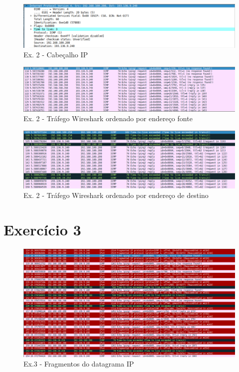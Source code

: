 \documentclass[a4paper]{report}
\begin{document}
\begin{figure}[H]
    \centering 
    \includegraphics[width=\textwidth]{images/ipEx2.png}
    \caption{Ex. 2 - Cabeçalho IP}
    \label{fig:ipEx2}
\end{figure}

\begin{figure}[H]
    \centering 
    \includegraphics[width=\textwidth]{images/wiresharkSourceEx2.png}
    \caption{Ex. 2 - Tráfego Wireshark ordenado por endereço fonte}
    \label{fig:wiresharkSourceEx2}
\end{figure}

\begin{figure}[H]
    \centering 
    \includegraphics[width=\textwidth]{images/wiresharkDestinyEx2.png}
    \caption{Ex. 2 - Tráfego Wireshark ordenado por endereço de destino}
    \label{fig:wiresharkDestinyEx2}
\end{figure}

\pagebreak
\section{Exercício 3}

\begin{figure}[H]
    \centering 
    \includegraphics[width=\textwidth]{images/datagramaIpEx3.png}
    \caption{Ex.3 - Fragmentos do datagrama IP}
    \label{fig:datagramaIpEx3}
\end{figure}
\end{document}
